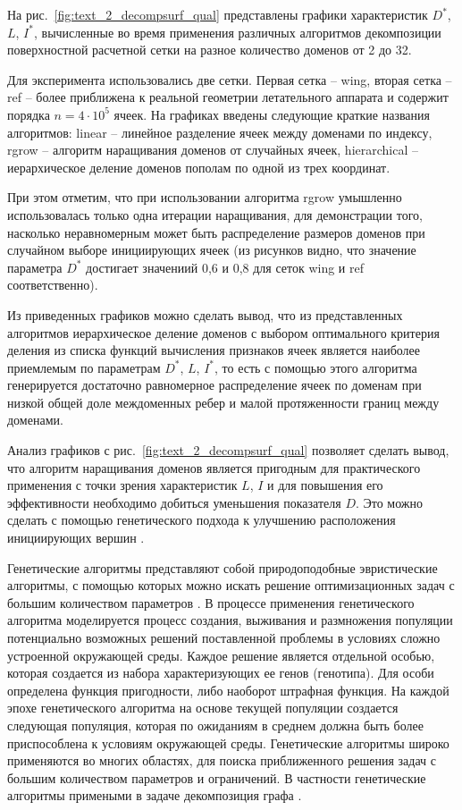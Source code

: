 На рис.~\ref{fig:text_2_decompsurf_qual} представлены графики характеристик $D^{*}$, $L$, $I^{*}$, вычисленные во время применения различных алгоритмов декомпозиции поверхностной расчетной сетки на разное количество доменов от 2 до 32.

Для эксперимента использовались две сетки.
Первая сетка -- wing, вторая сетка -- ref -- более приближена к реальной геометрии летательного аппарата и содержит порядка $n = 4 \cdot 10^5$ ячеек.
На графиках введены следующие краткие названия алгоритмов: linear -- линейное разделение ячеек между доменами по индексу, rgrow -- алгоритм наращивания доменов от случайных ячеек, hierarchical -- иерархическое деление доменов пополам по одной из трех координат.

При этом отметим, что при использовании алгоритма rgrow умышленно использовалась только одна итерации наращивания, для демонстрации того, насколько неравномерным может быть распределение размеров доменов при случайном выборе инициирующих ячеек (из рисунков видно, что значение параметра $D^{*}$ достигает значениий 0,6 и 0,8 для сеток wing и ref соответственно).

Из приведенных графиков можно сделать вывод, что из представленных алгоритмов иерархическое деление доменов с выбором оптимального критерия деления из списка функций вычисления признаков ячеек является наиболее приемлемым по параметрам $D^{*}$, $L$, $I^{*}$, то есть с помощью этого алгоритма генерируется достаточно равномерное распределение ячеек по доменам при низкой общей доле междоменных ребер и малой протяженности границ между доменами.


Анализ графиков с рис.~\ref{fig:text_2_decompsurf_qual} позволяет сделать вывод, что алгоритм наращивания доменов является пригодным для практического применения с точки зрения характеристик $L$, $I$ и для повышения его эффективности необходимо добиться уменьшения показателя $D$.
Это можно сделать с помощью генетического подхода к улучшению расположения инициирующих вершин \cite{Rybakov2025GenDecomp}.

Генетические алгоритмы представляют собой природоподобные эвристические алгоритмы, с помощью которых можно искать решение оптимизационных задач с большим количеством параметров \cite{Chahar2021Gen}.
В процессе применения генетического алгоритма моделируется процесс создания, выживания и размножения популяции потенциально возможных решений поставленной проблемы в условиях сложно устроенной окружающей среды.
Каждое решение является отдельной особью, которая создается из набора характеризующих ее генов (генотипа).
Для особи определена функция пригодности, либо наоборот штрафная функция. 
На каждой эпохе генетического алгоритма на основе текущей популяции создается следующая популяция, которая по ожиданиям в среднем должна быть более приспособлена к условиям окружающей среды.
Генетические алгоритмы широко применяются во многих областях, для поиска приближенного решения задач с большим количеством параметров и ограничений.
В частности генетические алгоритмы примеными в задаче декомпозиция графа \cite{Chaouche2023Graph,Li2020Graph}.


